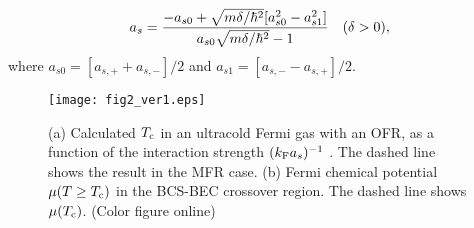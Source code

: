 \documentclass[a4paper]{jpconf}
\begin{document}
\begin{equation}
a_s=
{
-a_{s0}+\sqrt{m\delta/\hbar^2}[a_{s0}^2-a_{s1}^2]
\over
a_{s0}\sqrt{m\delta/\hbar^2}-1}~~~(\delta>0),
\label{eq.13}
\end{equation}
where $a_{s0}=[a_{s,+}+a_{s,-}]/2$ and $a_{s1}=[a_{s,-}-a_{s,+}]/2$.
\par
\begin{figure}[t]
\center
\texttt{[image: fig2\_ver1.eps]}
\caption{(a) Calculated $T_{\rm c}$ in an ultracold Fermi gas with an OFR, as a function of the interaction strength  $(k_{\rm F}a_s)^{-1}$ . The dashed line shows the result in the MFR case. (b) Fermi chemical potential $\mu(T\ge T_{\rm c})$ in the BCS-BEC crossover region. The dashed line shows $\mu(T_{\rm c})$. (Color figure online)}
\label{fig2}
\end{figure}
\par
\end{document}
